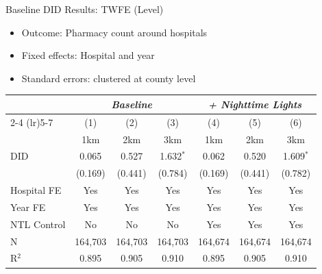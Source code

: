 \documentclass{beamer}
\begin{document}
\begin{frame}{Baseline DID Results: TWFE (Level)}

\begin{itemize}
    \item Outcome: Pharmacy count around hospitals
    \item Fixed effects: Hospital and year
    \item Standard errors: clustered at county level
\end{itemize}

\vspace{0.3em}
\centering
\footnotesize

\begin{table}[htbp]\centering
\begin{tabular}{lcccccc}
\toprule
& \multicolumn{3}{c}{\textit{Baseline}} 
& \multicolumn{3}{c}{\textit{+ Nighttime Lights}} \\
\cmidrule(lr){2-4} \cmidrule(lr){5-7}
& (1) & (2) & (3) & (4) & (5) & (6) \\
& 1km & 2km & 3km & 1km & 2km & 3km \\
\midrule

DID 
& 0.065 & 0.527 & 1.632$^{*}$ 
& 0.062 & 0.520 & 1.609$^{*}$ \\
& (0.169) & (0.441) & (0.784) 
& (0.169) & (0.441) & (0.782) \\

\midrule
Hospital FE & Yes & Yes & Yes & Yes & Yes & Yes \\
Year FE     & Yes & Yes & Yes & Yes & Yes & Yes \\
NTL Control & No  & No  & No  & Yes & Yes & Yes \\
\midrule
N 
& 164{,}703 & 164{,}703 & 164{,}703 
& 164{,}674 & 164{,}674 & 164{,}674 \\
R$^{2}$ 
& 0.895 & 0.905 & 0.910 
& 0.895 & 0.905 & 0.910 \\

\bottomrule
\end{tabular}
\end{table}

\end{frame}
\end{document}
